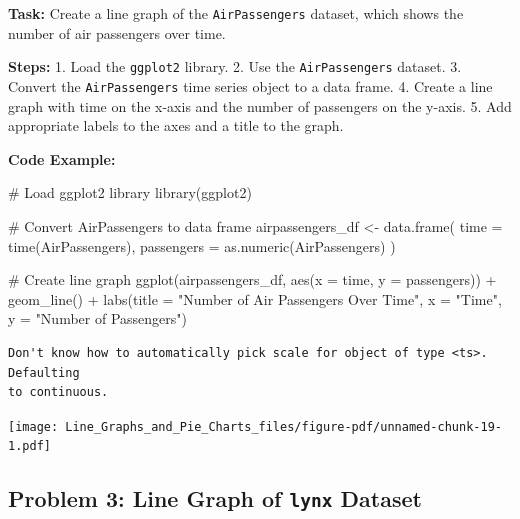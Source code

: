 \documentclass[
  letterpaper,
  DIV=11,
  numbers=noendperiod]{scrreprt}
\newenvironment{Shaded}{\begin{snugshade}}{\end{snugshade}}
\newcommand{\AttributeTok}[1]{\textcolor[rgb]{0.40,0.45,0.13}{#1}}
\newcommand{\CommentTok}[1]{\textcolor[rgb]{0.37,0.37,0.37}{#1}}
\newcommand{\FunctionTok}[1]{\textcolor[rgb]{0.28,0.35,0.67}{#1}}
\newcommand{\NormalTok}[1]{\textcolor[rgb]{0.00,0.23,0.31}{#1}}
\newcommand{\OtherTok}[1]{\textcolor[rgb]{0.00,0.23,0.31}{#1}}
\newcommand{\SpecialCharTok}[1]{\textcolor[rgb]{0.37,0.37,0.37}{#1}}
\newcommand{\StringTok}[1]{\textcolor[rgb]{0.13,0.47,0.30}{#1}}
\begin{document}
\textbf{Task:} Create a line graph of the \texttt{AirPassengers}
dataset, which shows the number of air passengers over time.

\textbf{Steps:} 1. Load the \texttt{ggplot2} library. 2. Use the
\texttt{AirPassengers} dataset. 3. Convert the \texttt{AirPassengers}
time series object to a data frame. 4. Create a line graph with time on
the x-axis and the number of passengers on the y-axis. 5. Add
appropriate labels to the axes and a title to the graph.

\textbf{Code Example:}

\begin{Shaded}
\begin{Highlighting}[]
\CommentTok{\# Load ggplot2 library}
\FunctionTok{library}\NormalTok{(ggplot2)}

\CommentTok{\# Convert AirPassengers to data frame}
\NormalTok{airpassengers\_df }\OtherTok{\textless{}{-}} \FunctionTok{data.frame}\NormalTok{(}
  \AttributeTok{time =} \FunctionTok{time}\NormalTok{(AirPassengers),}
  \AttributeTok{passengers =} \FunctionTok{as.numeric}\NormalTok{(AirPassengers)}
\NormalTok{)}

\CommentTok{\# Create line graph}
\FunctionTok{ggplot}\NormalTok{(airpassengers\_df, }\FunctionTok{aes}\NormalTok{(}\AttributeTok{x =}\NormalTok{ time, }\AttributeTok{y =}\NormalTok{ passengers)) }\SpecialCharTok{+}
  \FunctionTok{geom\_line}\NormalTok{() }\SpecialCharTok{+}
  \FunctionTok{labs}\NormalTok{(}\AttributeTok{title =} \StringTok{"Number of Air Passengers Over Time"}\NormalTok{,}
       \AttributeTok{x =} \StringTok{"Time"}\NormalTok{,}
       \AttributeTok{y =} \StringTok{"Number of Passengers"}\NormalTok{)}
\end{Highlighting}
\end{Shaded}

\begin{verbatim}
Don't know how to automatically pick scale for object of type <ts>. Defaulting
to continuous.
\end{verbatim}

\texttt{[image: Line\_Graphs\_and\_Pie\_Charts\_files/figure-pdf/unnamed-chunk-19-1.pdf]}

\subsection*{\texorpdfstring{Problem 3: Line Graph of \texttt{lynx}
Dataset}{Problem 3: Line Graph of lynx Dataset}}\label{problem-3-line-graph-of-lynx-dataset}
\end{document}
